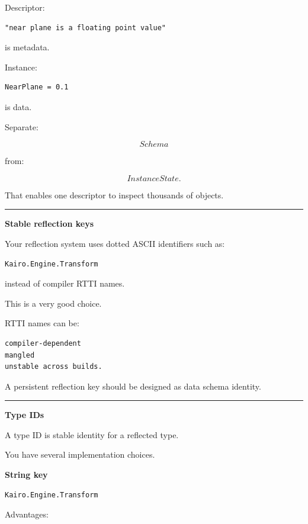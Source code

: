 Descriptor:

\begin{verbatim}
"near plane is a floating point value"
\end{verbatim}

is metadata.

Instance:

\begin{verbatim}
NearPlane = 0.1
\end{verbatim}

is data.

Separate:

\[
Schema
\]

from:

\[
InstanceState.
\]

That enables one descriptor to inspect thousands of objects.

\begin{center}\rule{0.5\linewidth}{0.5pt}\end{center}

\textbf{Stable reflection keys}

Your reflection system uses dotted ASCII identifiers such as:

\begin{verbatim}
Kairo.Engine.Transform
\end{verbatim}

instead of compiler RTTI names.

This is a very good choice.

RTTI names can be:

\begin{verbatim}
compiler-dependent
mangled
unstable across builds.
\end{verbatim}

A persistent reflection key should be designed as data schema identity.

\begin{center}\rule{0.5\linewidth}{0.5pt}\end{center}

\textbf{Type IDs}

A type ID is stable identity for a reflected type.

You have several implementation choices.

\textbf{String key}

\begin{verbatim}
Kairo.Engine.Transform
\end{verbatim}

Advantages:

